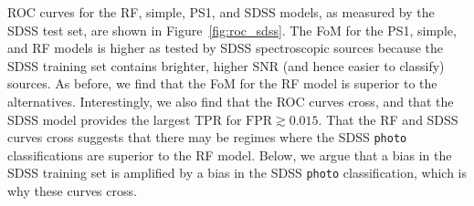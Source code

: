 \documentclass[twocolumn]{aastex62}
\begin{document}
ROC curves for the RF, simple, PS1, and SDSS models, as measured by the SDSS
test set, are shown in Figure~\ref{fig:roc_sdss}. The FoM for the PS1,
simple, and RF models is higher as tested by SDSS spectroscopic sources
because the SDSS training set contains brighter, higher SNR (and hence
easier to classify) sources. As before, we find that the FoM for the RF
model is superior to the alternatives. Interestingly, we also find that the
ROC curves cross, and that the SDSS model provides the largest TPR for
$\mathrm{FPR} \gtrsim 0.015$. That the RF and SDSS curves cross suggests
that there may be regimes where the SDSS \texttt{photo} classifications are
superior to the RF model. Below, we argue that a bias in the SDSS training
set is amplified by a bias in the SDSS \texttt{photo} classification, which
is why these curves cross.


\end{document}
